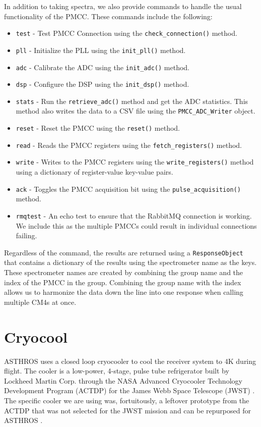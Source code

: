 In addition to taking spectra, we also provide commands to handle the usual functionality of the PMCC.
These commands include the following:
\begin{itemize}
    \item \texttt{test} - Test PMCC Connection using the \texttt{check\_connection()} method.
    \item \texttt{pll} - Initialize the PLL using the \texttt{init\_pll()} method.
    \item \texttt{adc} - Calibrate the ADC using the \texttt{init\_adc()} method.
    \item \texttt{dsp} - Configure the DSP using the \texttt{init\_dsp()} method.
    \item \texttt{stats} - Run the \texttt{retrieve\_adc()} method and get the ADC statistics. This method also writes the data to a CSV file using the \texttt{PMCC\_ADC\_Writer} object.
    \item \texttt{reset} - Reset the PMCC using the \texttt{reset()} method.
    \item \texttt{read} - Reads the PMCC registers using the \texttt{fetch\_registers()} method.
    \item \texttt{write} - Writes to the PMCC registers using the \texttt{write\_registers()} method using a dictionary of register-value key-value pairs.
    \item \texttt{ack} - Toggles the PMCC acquisition bit using the \texttt{pulse\_acquisition()} method.
    \item \texttt{rmqtest} - An echo test to ensure that the RabbitMQ connection is working. We include this as the multiple PMCCs could result in individual connections failing.
\end{itemize}
Regardless of the command, the results are returned using a \texttt{ResponseObject} that contains a dictionary of the results using the spectrometer name as the keys.
These spectrometer names are created by combining the group name and the index of the PMCC in the group.
Combining the group name with the index allows us to harmonize the data down the line into one response when calling multiple CM4s at once.

\section{Cryocool}
ASTHROS uses a closed loop cryocooler to cool the receiver system to 4K during flight.
The cooler is a low-power, 4-stage, pulse tube refrigerator built by Lockheed Martin Corp. through the NASA Advanced Cryocooler Technology Development Program (ACTDP) for the James Webb Space Telescope (JWST) \parencite{olson2005lockheed} \parencite{coulter2003nasa}.
The specific cooler we are using was, fortuitously, a leftover prototype from the ACTDP that was not selected for the JWST mission and can be repurposed for ASTHROS \parencite{kawamuraterahertz}.

